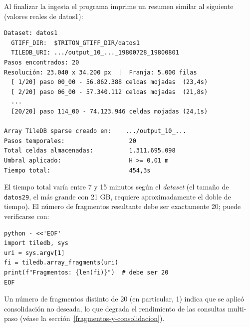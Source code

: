 Al finalizar la ingesta el programa imprime un resumen similar al siguiente (valores reales de datos1):

\begin{verbatim}
Dataset: datos1
  GTIFF_DIR:  $TRITON_GTIFF_DIR/datos1
  TILEDB_URI: .../output_10_..._19800728_19800801
Pasos encontrados: 20
Resolución: 23.040 x 34.200 px  |  Franja: 5.000 filas
  [ 1/20] paso 00_00 - 56.862.388 celdas mojadas  (23,4s)
  [ 2/20] paso 06_00 - 57.340.112 celdas mojadas  (21,8s)
  ...
  [20/20] paso 114_00 - 74.123.946 celdas mojadas (24,1s)

Array TileDB sparse creado en:    .../output_10_...
Pasos temporales:                  20
Total celdas almacenadas:          1.311.695.098
Umbral aplicado:                   H >= 0,01 m
Tiempo total:                      454,3s
\end{verbatim}

El tiempo total varía entre 7 y 15 minutos según el \textit{dataset} (el tamaño de \texttt{datos29}, el más grande con 21 GB, requiere aproximadamente el doble de tiempo). El número de fragmentos resultante debe ser exactamente 20; puede verificarse con:

\begin{verbatim}
python - <<'EOF'
import tiledb, sys
uri = sys.argv[1]
fi = tiledb.array_fragments(uri)
print(f"Fragmentos: {len(fi)}")  # debe ser 20
EOF
\end{verbatim}

Un número de fragmentos distinto de 20 (en particular, 1) indica que se aplicó consolidación no deseada, lo que degrada el rendimiento de las consultas multi-paso (véase la sección~\ref{fragmentos-y-consolidacion}).
